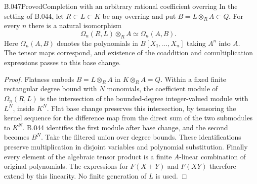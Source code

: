 \begin{saresult}{B.047}{Proved}{Completion with an arbitrary rational coefficient overring}
In the setting of B.044, let $R\subset L\subset K$ be
any overring and put $B=L\otimes_R A\subset Q$.
For every $n$ there is a natural isomorphism
\[
 \Omega_n(R,L)\otimes_R A\simeq\Omega_n(A,B).
\]
Here $\Omega_n(A,B)$ denotes the polynomials in $B[X_1,
\ldots,X_n]$ taking $A^n$ into $A$. The tensor maps
correspond, and existence of the coaddition and
comultiplication expressions passes to this base change.
\end{saresult}
\begin{proof}
Flatness embeds $B=L\otimes_R A$ in $K\otimes_R A=Q$.
Within a fixed finite rectangular degree bound with $N$
monomials, the coefficient module of $\Omega_n(R,L)$ is
the intersection of the bounded-degree integer-valued
module with $L^N$, inside $K^N$. Flat base change preserves
this intersection, by tensoring the kernel sequence for
the difference map from the direct sum of the two
submodules to $K^N$. B.044 identifies the first module
after base change, and the second becomes $B^N$.
Take the filtered union over degree bounds. These
identifications preserve multiplication in disjoint
variables and polynomial substitution. Finally every
element of the algebraic tensor product is a finite
$A$-linear combination of original polynomials. The
expressions for $F(X+Y)$ and $F(XY)$ therefore extend
by this linearity. No finite generation of $L$ is used.
\end{proof}

